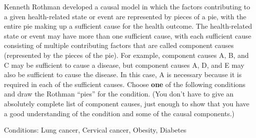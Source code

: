 
Kenneth Rothman developed a causal model in which the factors contributing to a given health-related state or event are represented by pieces of a pie, with the entire pie making up a sufficient cause for the health outcome.  The health-related state or event may have more than one sufficient cause, with each sufficient cause consisting of multiple contributing factors that are called component causes (represented by the pieces of the pie).  For example, component causes A, B, and C may be sufficient to cause a disease, but component causes A, D, and E may also be sufficient to cause the disease.  In this case, A is necessary because it is required in each of the sufficient causes.  Choose {\bf one}  of the following conditions and draw the Rothman ``pies'' for the condition.  (You don't have to give an absolutely complete list of  component causes, just enough to show that you have a good understanding of the condition and some of the causal components.)

\bigskip
Conditions: Lung cancer, Cervical cancer, Obesity, Diabetes

\TextEntry